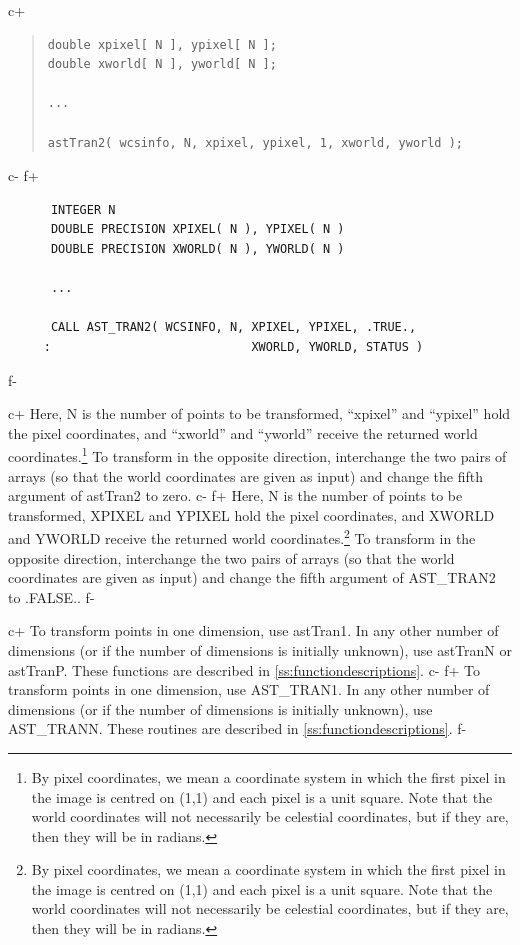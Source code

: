 \documentclass[twoside,11pt]{article}
\newcommand{\appref}[1]{Appendix~\ref{#1}}
\renewcommand{\appref}[1]{\ref{#1}}
\begin{document}
c+
\begin{quote}
\small
\begin{verbatim}
double xpixel[ N ], ypixel[ N ];
double xworld[ N ], yworld[ N ];

...

astTran2( wcsinfo, N, xpixel, ypixel, 1, xworld, yworld );
\end{verbatim}
\normalsize
\end{quote}
c-
f+
\small
\begin{verbatim}
      INTEGER N
      DOUBLE PRECISION XPIXEL( N ), YPIXEL( N )
      DOUBLE PRECISION XWORLD( N ), YWORLD( N )

      ...

      CALL AST_TRAN2( WCSINFO, N, XPIXEL, YPIXEL, .TRUE.,
     :                            XWORLD, YWORLD, STATUS )
\end{verbatim}
\normalsize
f-

c+
Here, N is the number of points to be transformed, ``xpixel'' and
``ypixel'' hold the pixel coordinates, and ``xworld'' and ``yworld''
receive the returned world coordinates.\footnote{By pixel coordinates,
we mean a coordinate system in which the first pixel in the image is
centred on (1,1) and each pixel is a unit square.  Note that the world
coordinates will not necessarily be celestial coordinates, but if they
are, then they will be in radians.}  To transform in the opposite
direction, interchange the two pairs of arrays (so that the world
coordinates are given as input) and change the fifth argument of
astTran2 to zero.
c-
f+
Here, N is the number of points to be transformed, XPIXEL and YPIXEL
hold the pixel coordinates, and XWORLD and YWORLD receive the returned
world coordinates.\footnote{By pixel coordinates, we mean a coordinate
system in which the first pixel in the image is centred on (1,1) and
each pixel is a unit square.  Note that the world coordinates will not
necessarily be celestial coordinates, but if they are, then they will
be in radians.}  To transform in the opposite direction, interchange
the two pairs of arrays (so that the world coordinates are given as
input) and change the fifth argument of AST\_TRAN2 to .FALSE..
f-

c+
To transform points in one dimension, use astTran1. In any other
number of dimensions (or if the number of dimensions is initially
unknown), use astTranN or astTranP. These functions are described in
\appref{ss:functiondescriptions}.
c-
f+
To transform points in one dimension, use AST\_TRAN1. In any other
number of dimensions (or if the number of dimensions is initially
unknown), use AST\_TRANN. These routines are described in
\appref{ss:functiondescriptions}.
f-
\end{document}
